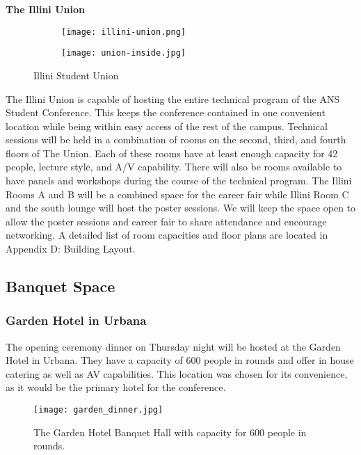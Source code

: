 \textbf{The Illini Union}\\

\begin{figure}[H]
	\centering
	\begin{subfigure}{0.5\textwidth}
		\centering
		\texttt{[image: illini-union.png]}
	\end{subfigure}%
	\begin{subfigure}{0.5\textwidth}
		\centering
		\texttt{[image: union-inside.jpg]}
	\end{subfigure}
	\caption{Illini Student Union}		
\end{figure} 


The Illini Union is capable of hosting the entire technical program of the ANS Student Conference. This keeps the conference contained in one convenient location while being within easy access of the rest of the campus. Technical sessions will be held in a combination of rooms on the second, third, and fourth floors of The Union. Each of these rooms have at least enough capacity for 42 people, lecture style, and A/V capability. There will also be rooms available to have panels and workshops during the course of the technical program. The Illini Rooms A and B will be a combined space for the career fair while Illini Room C and the south lounge will host the poster sessions. We will keep the space open to allow the poster sessions and career fair to share attendance and encourage networking. A detailed list of room capacities and floor plans are located in Appendix D: Building Layout. \\


\subsection{Banquet Space}
\subsubsection{Garden Hotel in Urbana}
The opening ceremony dinner on Thursday night will be hosted at the Garden Hotel in Urbana. They have a capacity of 600 people in rounds and offer in house catering as well as AV capabilities. This location was chosen for its convenience, as it would be the primary hotel for the conference. 

\begin{figure}[H]
    \centering
    \texttt{[image: garden\_dinner.jpg]}
    \caption{The Garden Hotel Banquet Hall with capacity for 600 people in rounds.}
\end{figure}

